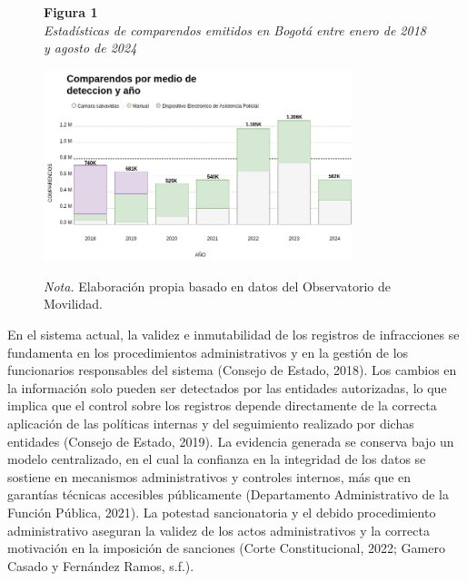 \begin{figure}[htbp]
    \begin{flushleft}
        \textbf{Figura 1}\\[2em]
        \textit{Estadísticas de comparendos emitidos en Bogotá entre enero de 2018 y agosto de 2024}
    \end{flushleft}
    \vspace{1em}
    \centering
    \includegraphics[width=0.8\textwidth]{Images/numComparendos.png}
    \vspace{2em}
    \begin{flushleft}
        \textit{Nota.} Elaboración propia basado en datos del Observatorio de Movilidad.
    \end{flushleft}
    \label{fig:estadisticas_comparendos}
\end{figure}

En el sistema actual, la validez e inmutabilidad de los registros de infracciones se fundamenta en los procedimientos administrativos y en la gestión de los funcionarios responsables del sistema (Consejo de Estado, 2018). Los cambios en la información solo pueden ser detectados por las entidades autorizadas, lo que implica que el control sobre los registros depende directamente de la correcta aplicación de las políticas internas y del seguimiento realizado por dichas entidades (Consejo de Estado, 2019). La evidencia generada se conserva bajo un modelo centralizado, en el cual la confianza en la integridad de los datos se sostiene en mecanismos administrativos y controles internos, más que en garantías técnicas accesibles públicamente (Departamento Administrativo de la Función Pública, 2021). La potestad sancionatoria y el debido procedimiento administrativo aseguran la validez de los actos administrativos y la correcta motivación en la imposición de sanciones (Corte Constitucional, 2022; Gamero Casado y Fernández Ramos, s.f.).

